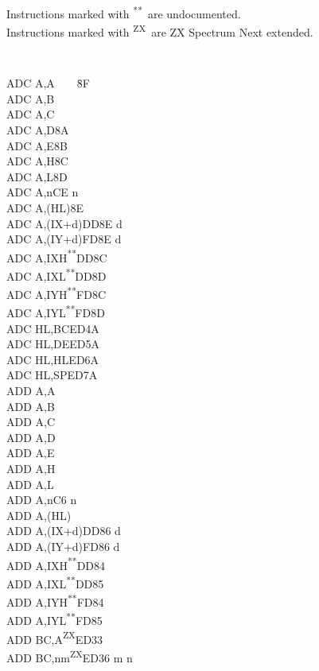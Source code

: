 \documentclass[12pt,twoside,openright,a4paper]{book}
\newcommand{\UNDOC}{\textnormal{\textsuperscript{**}}}
\newcommand{\ZXN}{\textnormal{\textsuperscript{ZX}}}
\begin{document}
Instructions marked with \UNDOC ~are undocumented.\\
Instructions marked with \ZXN ~are ZX Spectrum Next extended.
\setlength\columnsep{4em}
\begin{multicols}{3}
{
	\tt 
	\footnotesize
	\begin{tabbing}
		ADC A,A~~~~{\qquad}{\quad}\=8F\\
		ADC A,B\\
		ADC A,C\\
		ADC A,D\>8A\\
		ADC A,E\>8B\\
		ADC A,H\>8C\\
		ADC A,L\>8D\\
		ADC A,n\>CE n\\
		ADC A,(HL)\>8E\\
		ADC A,(IX+d)\>DD8E d\\
		ADC A,(IY+d)\>FD8E d\\
		ADC A,IXH\UNDOC\>DD8C\\
		ADC A,IXL\UNDOC\>DD8D\\
		ADC A,IYH\UNDOC\>FD8C\\
		ADC A,IYL\UNDOC\>FD8D\\
		ADC HL,BC\>ED4A\\
		ADC HL,DE\>ED5A\\
		ADC HL,HL\>ED6A\\
		ADC HL,SP\>ED7A\\
		ADD A,A\\
		ADD A,B\\
		ADD A,C\\
		ADD A,D\\
		ADD A,E\\
		ADD A,H\\
		ADD A,L\\
		ADD A,n\>C6 n\\
		ADD A,(HL)\\
		ADD A,(IX+d)\>DD86 d\\
		ADD A,(IY+d)\>FD86 d\\
		ADD A,IXH\UNDOC\>DD84\\
		ADD A,IXL\UNDOC\>DD85\\
		ADD A,IYH\UNDOC\>FD84\\
		ADD A,IYL\UNDOC\>FD85\\
		ADD BC,A\ZXN\>ED33\\
		ADD BC,nm\ZXN\>ED36	m n\\

\end{tabbing}}
\end{multicols}
\end{document}
